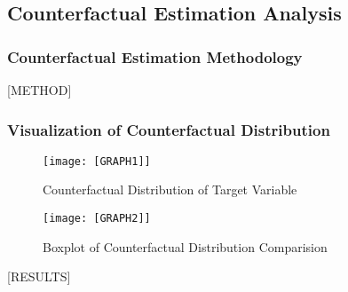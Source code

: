 \subsection{Counterfactual Estimation Analysis}

\subsubsection{Counterfactual Estimation Methodology}

[METHOD]

\subsubsection{Visualization of Counterfactual Distribution}

\begin{minipage}[t]{0.5\linewidth}
    \begin{figure}[H]
        \centering
        \vspace{-1.5cm}
        \texttt{[image: [GRAPH1]]}
        \caption{Counterfactual Distribution of Target Variable}
    \end{figure}
\vfill
\end{minipage}
\hfill
\begin{minipage}[t]{0.5\linewidth}
    \begin{figure}[H]
        \centering
        \vspace{-1.5cm}
        \texttt{[image: [GRAPH2]]}
        \caption{Boxplot of Counterfactual Distribution Comparision}
    \end{figure}
\end{minipage}

[RESULTS]
